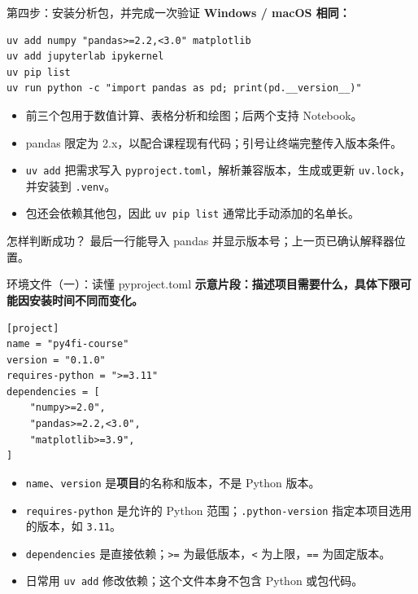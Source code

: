 \documentclass[9pt]{ctexbeamer}
\begin{document}
\begin{frame}[fragile]{第四步：安装分析包，并完成一次验证}
  \textbf{Windows / macOS 相同：}
\begin{lstlisting}[language={},numbers=none]
uv add numpy "pandas>=2.2,<3.0" matplotlib
uv add jupyterlab ipykernel
uv pip list
uv run python -c "import pandas as pd; print(pd.__version__)"
\end{lstlisting}
  \begin{itemize}
    \item 前三个包用于数值计算、表格分析和绘图；后两个支持 Notebook。
    \item pandas 限定为 2.x，以配合课程现有代码；引号让终端完整传入版本条件。
    \item \texttt{uv add} 把需求写入 \texttt{pyproject.toml}，解析兼容版本，生成或更新 \texttt{uv.lock}，并安装到 \texttt{.venv}。
    \item 包还会依赖其他包，因此 \texttt{uv pip list} 通常比手动添加的名单长。
  \end{itemize}
  \begin{block}{怎样判断成功？}
    最后一行能导入 pandas 并显示版本号；上一页已确认解释器位置。
  \end{block}
\end{frame}

\begin{frame}[fragile]{环境文件（一）：读懂 pyproject.toml}
  \textbf{示意片段：描述项目需要什么，具体下限可能因安装时间不同而变化。}
\begin{lstlisting}[language={},numbers=none]
[project]
name = "py4fi-course"
version = "0.1.0"
requires-python = ">=3.11"
dependencies = [
    "numpy>=2.0",
    "pandas>=2.2,<3.0",
    "matplotlib>=3.9",
]
\end{lstlisting}
  \begin{itemize}
    \item \texttt{name}、\texttt{version} 是\textbf{项目}的名称和版本，不是 Python 版本。
    \item \texttt{requires-python} 是允许的 Python 范围；\texttt{.python-version} 指定本项目选用的版本，如 \texttt{3.11}。
    \item \texttt{dependencies} 是直接依赖；\texttt{>=} 为最低版本，\texttt{<} 为上限，\texttt{==} 为固定版本。
    \item 日常用 \texttt{uv add} 修改依赖；这个文件本身不包含 Python 或包代码。
  \end{itemize}
\end{frame}
\end{document}
